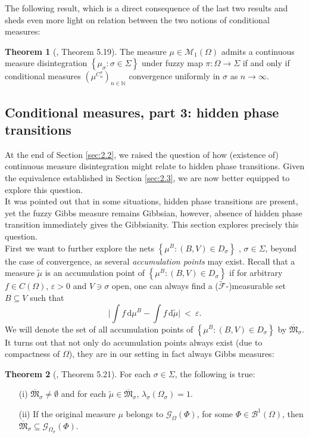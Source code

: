 \documentclass[12pt]{article}
\newcommand{\BB}{\mathscr{B}}
\renewcommand{\d}{\mathrm{d}}
\newcommand{\F}{\mathcal{F}}
\newcommand{\G}{\mathcal{G}}
\newcommand{\M}{\mathcal{M}}
\newcommand{\MM}{\mathfrak{M}}
\newcommand{\N}{\mathbb{N}}
\newcommand{\set}[1]{\left\{#1\right\}}
\newcommand{\ra}{\rightarrow}
\newcommand{\1}{\mathbbm{1}}
\newcommand{\5}{\vspace{0.5cm}}
\renewcommand{\tilde}{\widetilde}
\theoremstyle{definition}
\newtheorem{thm}{Theorem}[section]
\begin{document}
The following result, which is a direct consequence of the last two results and sheds even more light on relation between the two notions of conditional measures:
\begin{thm}[\cite{Ber}, Theorem 5.19]
The measure $\mu\in\M_1(\Omega)$ admits a continuous measure disintegration $\set{\mu_\sigma:\sigma\in\Sigma}$ under fuzzy map $\pi:\Omega\ra\Sigma$ if and only if conditional measures $(\mu^{C_n^\sigma})_{n\in\N}$ convergence uniformly in $\sigma$ as $n\ra\infty$.
\end{thm}


\subsection{Conditional measures, part 3: hidden phase transitions}

At the end of Section \ref{sec:2.2}, we raised the question of how (existence of) continuous measure disintegration might relate to hidden phase transitions. Given the equivalence established in Section \ref{sec:2.3}, we are now better equipped to explore this question. \\

It was pointed out that in some situations, hidden phase transitions are present, yet the fuzzy Gibbs measure remains Gibbsian, however, absence of hidden phase transition immediately gives the Gibbsianity. This section explores precisely this question. \\

First we want to further explore the nets $\set{\mu^B:(B,V)\in D_\sigma}$ , $\sigma\in\Sigma$, beyond the case of convergence, as several \textit{accumulation points} may exist. Recall that a measure $\tilde{\mu}$ is an accumulation point of $\set{\mu^B:(B,V)\in D_\sigma}$ if for arbitrary $f\in C(\Omega)$, $\varepsilon>0$ and $V\ni \sigma$ open, one can always find a ($\tilde{\F}$-)measurable set $B\subseteq V$ such that 
$$\Big|\int f\,\d\mu^B - \int f\,\d\tilde{\mu}\Big| ~<~ \varepsilon.$$
We will denote the set of all accumulation points of $\set{\mu^B:(B,V)\in D_\sigma}$ by $\overline{\MM}_\sigma$. It turns out that not only do accumulation points always exist (due to compactness of $\Omega$), they are in our setting in fact always Gibbs measures:
\begin{thm}[\cite{Ber}, Theorem 5.21]\label{thm:TjurFibre}
For each $\sigma\in\Sigma$, the following is true:
\begin{itemize}
	\item[(i)] $\overline{\MM}_\sigma\neq \emptyset$ and for each $\tilde{\mu}\in\overline{\MM}_\sigma$, $\lambda_\sigma(\Omega_\sigma)=1$.
	\item[(ii)] If the original measure $\mu$ belongs to $\G_\Omega(\Phi)$, for some $\Phi\in\BB^1(\Omega)$, then $\overline{\MM}_\sigma\subseteq\G_{\Omega_\sigma}(\Phi)$.
\end{itemize}
\end{thm} 
\end{document}
